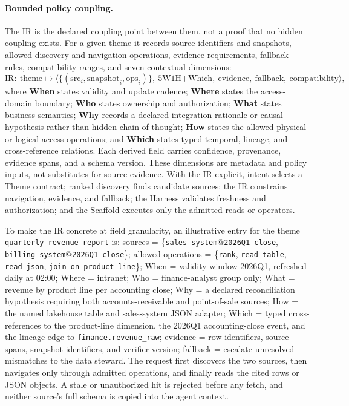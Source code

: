 \paragraph{Bounded policy coupling.}
The IR is the declared coupling point between them, not a proof that no hidden coupling exists. For a given theme it records source identifiers and snapshots, allowed discovery and navigation operations, evidence requirements, fallback rules, compatibility ranges, and seven contextual dimensions:
\begin{equation}
\mathrm{IR}:\ \mathrm{theme} \mapsto \langle \{(\mathrm{src}_i,\mathrm{snapshot}_i,\mathrm{ops}_i)\},\ \mathrm{5W1H}\mathrm{+}\mathrm{Which},\ \mathrm{evidence},\ \mathrm{fallback},\ \mathrm{compatibility} \rangle,
\end{equation}
where \textbf{When} states validity and update cadence; \textbf{Where} states the access-domain boundary; \textbf{Who} states ownership and authorization; \textbf{What} states business semantics; \textbf{Why} records a declared integration rationale or causal hypothesis rather than hidden chain-of-thought; \textbf{How} states the allowed physical or logical access operations; and \textbf{Which} states typed temporal, lineage, and cross-reference relations. Each derived field carries confidence, provenance, evidence spans, and a schema version. These dimensions are metadata and policy inputs, not substitutes for source evidence. With the IR explicit, intent selects a Theme contract; ranked discovery finds candidate sources; the IR constrains navigation, evidence, and fallback; the Harness validates freshness and authorization; and the Scaffold executes only the admitted reads or operators.

To make the IR concrete at field granularity, an illustrative entry for the theme \texttt{quarterly-revenue-report} is: sources = \{\texttt{sales-system}@\texttt{2026Q1-close}, \texttt{billing-system}@\texttt{2026Q1-close}\}; allowed operations = \{\texttt{rank}, \texttt{read-table}, \texttt{read-json}, \texttt{join-on-product-line}\}; When = validity window 2026Q1, refreshed daily at 02:00; Where = intranet; Who = finance-analyst group only; What = revenue by product line per accounting close; Why = a declared reconciliation hypothesis requiring both accounts-receivable and point-of-sale sources; How = the named lakehouse table and sales-system JSON adapter; Which = typed cross-references to the product-line dimension, the 2026Q1 accounting-close event, and the lineage edge to \texttt{finance.revenue\_raw}; evidence = row identifiers, source spans, snapshot identifiers, and verifier version; fallback = escalate unresolved mismatches to the data steward. The request first discovers the two sources, then navigates only through admitted operations, and finally reads the cited rows or JSON objects. A stale or unauthorized hit is rejected before any fetch, and neither source's full schema is copied into the agent context.


